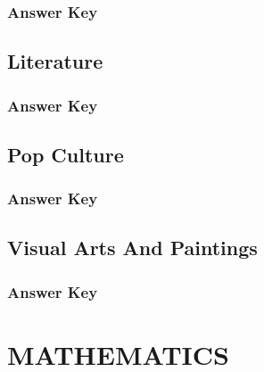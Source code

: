 \documentclass[12pt,a4paper]{book}
\newcounter{totalcounter}
\begin{document}
\subsection*{Answer Key}



\setcounter{totalcounter}{1}

\section{Literature}



\subsection*{Answer Key}



\setcounter{totalcounter}{1}

\section{Pop Culture}



\subsection*{Answer Key}



\setcounter{totalcounter}{1}

\section{Visual Arts And Paintings}



\subsection*{Answer Key}



\chapter{MATHEMATICS}
\end{document}
